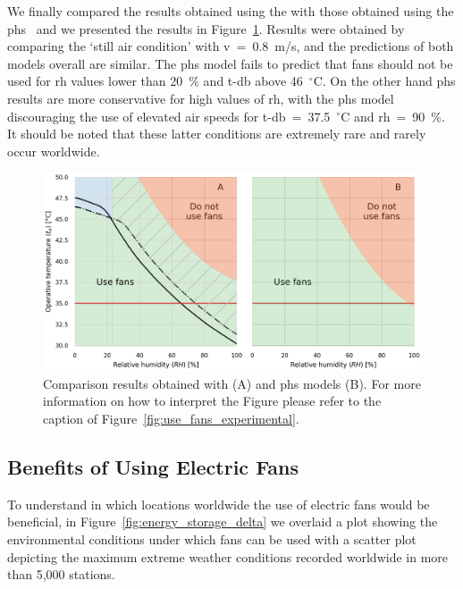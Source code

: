 We finally compared the results obtained using the  with those obtained using the \ac{phs}~\cite{iso7933} and we presented the results in Figure~\ref{fig:gagge_phs}.
Results were obtained by comparing the `still air condition' with \ac{v}~=~0.8~m/s, and the predictions of both models overall are similar.
The \ac{phs} model fails to predict that fans should not be used for \ac{rh} values lower than 20~\% and \ac{t-db} above 46~$^{\circ}$C\@.
On the other hand \ac{phs} results are more conservative for high values of \ac{rh}, with the \ac{phs} model discouraging the use of elevated air speeds for \ac{t-db}~=~37.5~$^{\circ}$C and \ac{rh}~=~90~\%\@.
It should be noted that these latter conditions are extremely rare and rarely occur worldwide.

\begin{figure}[thb!]
    \centering
    \includegraphics[width=\textwidth]{figures/phs_gagge}
    \caption{Comparison results obtained with  (A) and \ac{phs} models (B).
    For more information on how to interpret the Figure please refer to the caption of Figure~\ref{fig:use_fans_experimental}.}
    \label{fig:gagge_phs}
\end{figure}

\subsection{Benefits of Using Electric Fans}\label{subsec:use-fans}

To understand in which locations worldwide the use of electric fans would be beneficial, in Figure~\ref{fig:energy_storage_delta} we overlaid a plot showing the environmental conditions under which fans can be used with a scatter plot depicting the maximum extreme weather conditions recorded worldwide in more than 5,000 stations.

